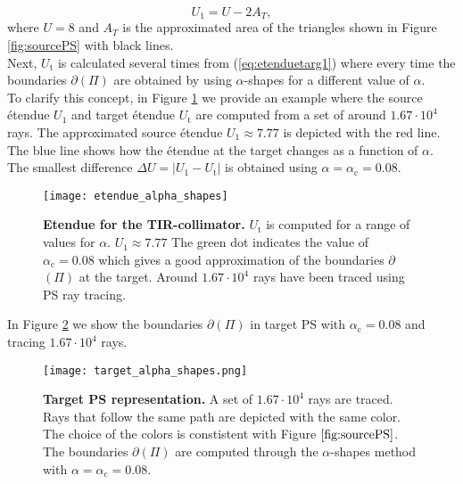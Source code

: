  \begin{equation}\label{eq:Usource}
 U_{1} = U-2A_{T},
 \end{equation}
 where $U=8$ and $A_{T}$ is the approximated area of the triangles shown in Figure \ref{fig:sourcePS} with black lines.\\ \indent  Next, $U_{\textrm{t}}$ is calculated several times from (\ref{eq:etenduetarg1}) where every time the boundaries $\partial$$(\Pi)$ are obtained by using $\alpha$-shapes for a different value of $\alpha$. 
\\ \indent To clarify this concept, in Figure \ref{fig:etendueTS} we provide an example where the source \'{e}tendue $U_1$ and target \'{e}tendue $U_{\textrm{t}}$ are computed from a set of around $1.67\cdot 10^4$ rays. The approximated source \'{e}tendue $U_1\approx 7.77$ is depicted with the red line. The blue line shows how the \'{e}tendue at the target changes as a function of $\alpha$. The smallest difference $\Delta U = |U_1-U_{\textrm{t}}|$ is obtained using $\alpha = \alpha_\textrm{c} = 0.08$.
 \begin{figure}[h]
  \begin{center}
  \texttt{[image: etendue\_alpha\_shapes]}
  \end{center}
  \caption{\textbf{Etendue for the TIR-collimator.} $U_\textrm{t}$ is computed for a range of values for $\alpha$. $U_1 \approx 7.77$
   The green dot indicates the value of $\alpha_\textrm{c} = 0.08$ which gives a good approximation of the boundaries $\partial$$(\Pi)$ at the target.
   Around $1.67 \cdot 10^4$ rays have been traced using PS ray tracing.
  }
  \label{fig:etendueTS}
\end{figure}
In Figure \ref{fig:targetPS} we show the boundaries 
$\partial$$(\Pi)$ in target PS with $\alpha_\textrm{c}=0.08$ and tracing $1.67\cdot10^4$ rays.
  \begin{figure}[h]
  \begin{center}
  \texttt{[image: target\_alpha\_shapes.png]}
  \end{center}
  \caption{\textbf{Target PS representation.} A set of $1.67 \cdot 10^4$ rays are traced.
  Rays that follow the same path are depicted with the same color. The choice of the colors is constistent with Figure $\ref{fig:sourcePS}$. The boundaries $\partial$$(\Pi)$ are computed through the $\alpha$-shapes method with $\alpha = \alpha_\textrm{c} = 0.08$.}
  \label{fig:targetPS}
\end{figure}
